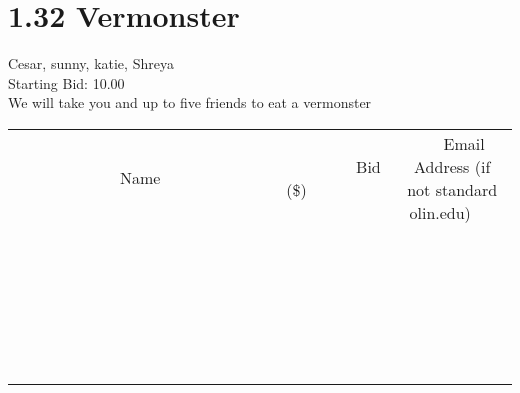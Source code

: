 \documentclass[11pt]{article}
\begin{document}
					\section*{1.32 Vermonster}
					Cesar, sunny, katie, Shreya \\
					Starting Bid: 10.00 \\
					We will take you and up to five friends to eat a vermonster \\
					[6ex]
					\begin{tabular}{c c c}
						~~~~~~~~~~~~~Name~~~~~~~~~~~~~ & ~~~~~~~~~Bid (\$)~~~~~~~~~ & ~~~Email Address (if not standard olin.edu)~~~ \\
				
 & & \\
\hline
 & & \\
\hline
 & & \\
\hline
 & & \\
\hline
 & & \\
\hline
 & & \\
\hline
 & & \\
\hline
 & & \\
\hline
 & & \\
\hline
 & & \\
\hline
 & & \\
\hline
 & & \\
\hline
 & & \\
\hline
 & & \\
\hline
 & & \\
\hline
 & & \\
\hline
 & & \\
\hline
 & & \\
\hline
 & & \\
\hline
 & & \\
\hline
 & & \\
\hline
 & & \\
\hline
 & & \\
\hline
 & & \\
\hline
 & & \\
\hline
 & & \\
\hline
					\end{tabular}
					\clearpage
				
\end{document}
